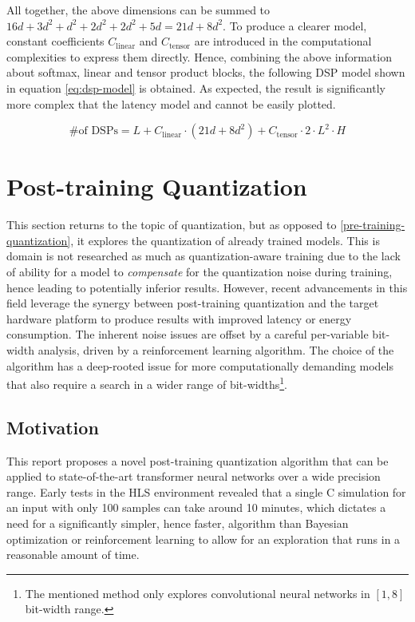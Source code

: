All together, the above dimensions can be summed to \(16d + 3d^2 + d^2 + 2d^2 + 2d^2 + 5d = 21d + 8d^2\). To produce a clearer model, constant coefficients \(C_{\text{linear}}\) and \(C_{\text{tensor}}\) are introduced in the computational complexities to express them directly. Hence, combining the above information about softmax, linear and tensor product blocks, the following DSP model shown in equation \ref{eq:dsp-model} is obtained. As expected, the result is significantly more complex that the latency model and cannot be easily plotted.

\begin{equation} \label{eq:dsp-model}
  \text{\# of DSPs} = L + C_{\text{linear}} \cdot (21d + 8d^2) + C_{\text{tensor}} \cdot 2 \cdot L^2 \cdot H
\end{equation}


\section{Post-training Quantization}\label{post-training-quantization}
This section returns to the topic of quantization, but as opposed to \cref{pre-training-quantization}, it explores the quantization of already trained models. This is domain is not researched as much as quantization-aware training due to the lack of ability for a model to \textit{compensate} for the quantization noise during training, hence leading to potentially inferior results. However, recent advancements in this field \cite{80-wang2019haq:} leverage the synergy between post-training quantization and the target hardware platform to produce results with improved latency or energy consumption. The inherent noise issues are offset by a careful per-variable bit-width analysis, driven by a reinforcement learning algorithm. The choice of the algorithm has a deep-rooted issue for more computationally demanding models that also require a search in a wider range of bit-widths\footnote{The mentioned method only explores convolutional neural networks in \([1, 8]\) bit-width range.}.

\subsection{Motivation}
This report proposes a novel post-training quantization algorithm that can be applied to state-of-the-art transformer neural networks over a wide precision range. Early tests in the HLS environment revealed that a single C simulation for an input with only 100 samples can take around 10 minutes, which dictates a need for a significantly simpler, hence faster, algorithm than Bayesian optimization or reinforcement learning to allow for an exploration that runs in a reasonable amount of time.

